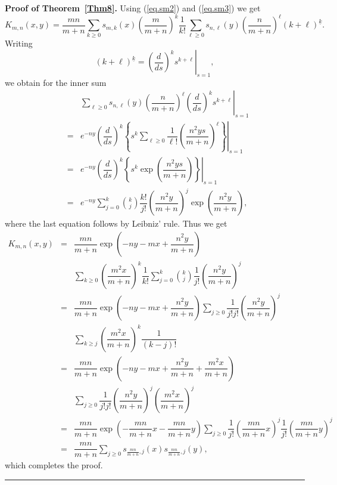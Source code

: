 \documentclass[12pt,reqno]{article}
\newenvironment{proof}[1][Proof]{\noindent\textbf{#1.} }{\ \rule{0.5em}{0.5em}}
\begin{document}
\begin{proof}[Proof of Theorem~\protect\ref{Thm8}]
Using (\ref{eq.sm2}) and (\ref{eq.sm3}) we get 
\begin{equation*}
K_{m,n}(x,y)=\displaystyle \frac{mn}{m+n}\sum_{k\geq 0}s_{m,k}(x)\left( 
\dfrac{m}{m+n}\right) ^{k}\dfrac{1}{k!}\sum_{\ell \geq 0}s_{n,\ell
}(y)\left( \dfrac{n}{m+n}\right) ^{\ell }(k+\ell )^{\underline{k}}.
\end{equation*}%
Writing 
\begin{equation*}
(k+\ell )^{\underline{k}}=\left. \left( \dfrac{d}{ds}\right) ^{k}s^{k+\ell
}\right \vert _{s=1},
\end{equation*}%
we obtain for the inner sum 
\begin{eqnarray*}
&&\displaystyle \sum_{\ell \geq 0}s_{n,\ell }(y)\left. \left( \dfrac{n}{m+n}%
\right) ^{\ell }\left( \dfrac{d}{ds}\right) ^{k}s^{k+\ell }\right \vert
_{s=1} \\
&=&e^{-ny}\left( \dfrac{d}{ds}\right) ^{k}\left. \left \{ s^{k}\sum_{\ell
\geq 0}\dfrac{1}{\ell !}{\left( \dfrac{n^{2}ys}{m+n}\right) ^{\ell }}\right
\} \right \vert _{s=1} \\
&=&e^{-ny}\left( \dfrac{d}{ds}\right) ^{k}\left. \left \{ s^{k}\exp \left( 
\dfrac{n^{2}ys}{m+n}\right) \right \} \right \vert _{s=1} \\
&=&e^{-ny}\sum_{j=0}^{k}{\binom{k}{j}}\dfrac{k!}{j!}\left( \dfrac{n^{2}y}{m+n%
}\right) ^{j}\exp \left( \dfrac{n^{2}y}{m+n}\right) ,
\end{eqnarray*}%
where the last equation follows by Leibniz' rule. Thus we get 
\begin{eqnarray*}
K_{m,n}(x,y) &=&\dfrac{mn}{m+n}\exp \left( -ny-mx+\dfrac{n^{2}y}{m+n}\right)
\\
&&\sum_{k\geq 0}\left( \dfrac{m^{2}x}{m+n}\right) ^{k}\dfrac{1}{k!}%
\sum_{j=0}^{k}{\binom{k}{j}}\dfrac{1}{j!}\left( \dfrac{n^{2}y}{m+n}\right)
^{j} \\
&=&\dfrac{mn}{m+n}\exp \left( -ny-mx+\dfrac{n^{2}y}{m+n}\right) \sum_{j\geq
0}\dfrac{1}{j!j!}\left( \dfrac{n^{2}y}{m+n}\right) ^{j} \\
&&\sum_{k\geq j}\left( \dfrac{m^{2}x}{m+n}\right) ^{k}\dfrac{1}{(k-j)!} \\
&=&\dfrac{mn}{m+n}\exp \left( -ny-mx+\dfrac{n^{2}y}{m+n}+\dfrac{m^{2}x}{m+n}%
\right) \\
&&\sum_{j\geq 0}\dfrac{1}{j!j!}\left( \dfrac{n^{2}y}{m+n}\right) ^{j}\left( 
\dfrac{m^{2}x}{m+n}\right) ^{j} \\
&=&\dfrac{mn}{m+n}\exp \left( -\dfrac{mn}{m+n}x-\dfrac{mn}{m+n}y\right)
\sum_{j\geq 0}\dfrac{1}{j!}\left( \dfrac{mn}{m+n}x\right) ^{j}\dfrac{1}{j!}%
\left( \dfrac{mn}{m+n}y\right) ^{j} \\
&=&\dfrac{mn}{m+n}\sum_{j\geq 0}s_{\frac{mn}{m+n},j}(x)s_{\frac{mn}{m+n}%
,j}(y),
\end{eqnarray*}
which completes the proof.
\end{proof}
\end{document}
